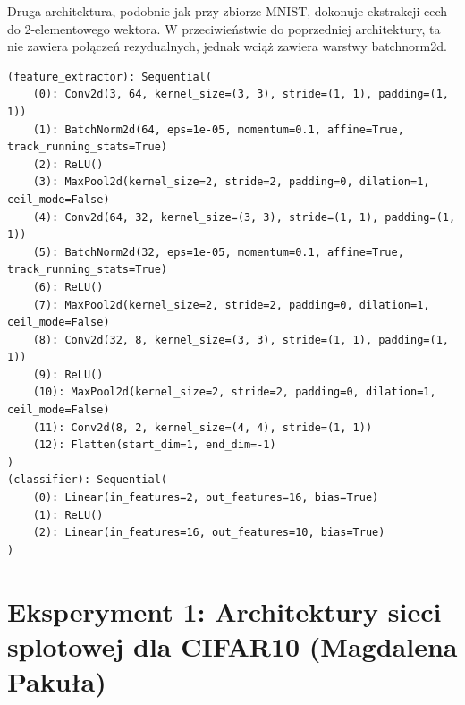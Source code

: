 \documentclass[10pt]{article}
\begin{document}
Druga architektura, podobnie jak przy zbiorze MNIST, dokonuje ekstrakcji cech do 2-elementowego wektora.
W przeciwieństwie do poprzedniej architektury, ta nie zawiera połączeń rezydualnych, jednak wciąż zawiera warstwy batchnorm2d.

\tiny
\begin{verbatim}
(feature_extractor): Sequential(
    (0): Conv2d(3, 64, kernel_size=(3, 3), stride=(1, 1), padding=(1, 1))
    (1): BatchNorm2d(64, eps=1e-05, momentum=0.1, affine=True, track_running_stats=True)
    (2): ReLU()
    (3): MaxPool2d(kernel_size=2, stride=2, padding=0, dilation=1, ceil_mode=False)
    (4): Conv2d(64, 32, kernel_size=(3, 3), stride=(1, 1), padding=(1, 1))
    (5): BatchNorm2d(32, eps=1e-05, momentum=0.1, affine=True, track_running_stats=True)
    (6): ReLU()
    (7): MaxPool2d(kernel_size=2, stride=2, padding=0, dilation=1, ceil_mode=False)
    (8): Conv2d(32, 8, kernel_size=(3, 3), stride=(1, 1), padding=(1, 1))
    (9): ReLU()
    (10): MaxPool2d(kernel_size=2, stride=2, padding=0, dilation=1, ceil_mode=False)
    (11): Conv2d(8, 2, kernel_size=(4, 4), stride=(1, 1))
    (12): Flatten(start_dim=1, end_dim=-1)
)
(classifier): Sequential(
    (0): Linear(in_features=2, out_features=16, bias=True)
    (1): ReLU()
    (2): Linear(in_features=16, out_features=10, bias=True)
)
\end{verbatim}
\normalsize

\pagebreak
\section{Eksperyment 1: Architektury sieci splotowej dla CIFAR10 (Magdalena Pakuła)}\label{sec:ex1-pakula_cifar}
\end{document}
